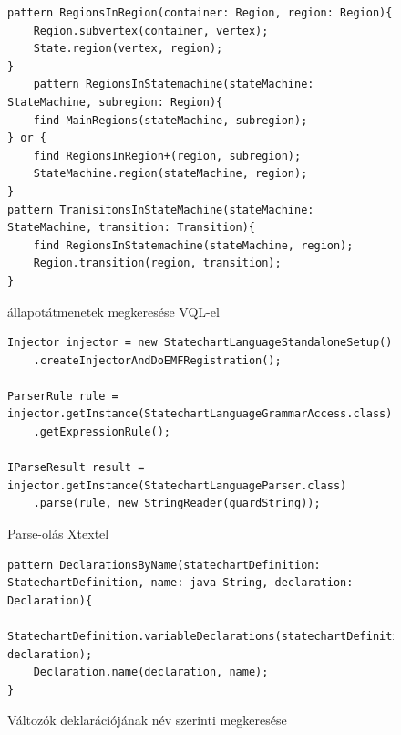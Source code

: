 \begin{figure}[!ht]
	\lstset{style=VQL}
	\begin{lstlisting}
pattern RegionsInRegion(container: Region, region: Region){
	Region.subvertex(container, vertex);
	State.region(vertex, region);
}
	pattern RegionsInStatemachine(stateMachine: StateMachine, subregion: Region){
	find MainRegions(stateMachine, subregion);
} or {
	find RegionsInRegion+(region, subregion);
	StateMachine.region(stateMachine, region);
}
pattern TranisitonsInStateMachine(stateMachine: StateMachine, transition: Transition){
	find RegionsInStatemachine(stateMachine, region);
	Region.transition(region, transition);
}
	\end{lstlisting}
	\caption{állapotátmenetek megkeresése VQL-el}
\end{figure}
\begin{figure}[!ht]
\lstset{style=javacode}
\begin{lstlisting}
Injector injector = new StatechartLanguageStandaloneSetup()
	.createInjectorAndDoEMFRegistration();

ParserRule rule = injector.getInstance(StatechartLanguageGrammarAccess.class)
	.getExpressionRule();

IParseResult result = injector.getInstance(StatechartLanguageParser.class)
	.parse(rule, new StringReader(guardString));
\end{lstlisting}
\caption{Parse-olás Xtextel}
\end{figure}

\begin{figure}[!ht]
\lstset{style=VQL}
\begin{lstlisting}
pattern DeclarationsByName(statechartDefinition: StatechartDefinition, name: java String, declaration: Declaration){
	StatechartDefinition.variableDeclarations(statechartDefinition, declaration);
	Declaration.name(declaration, name);
}
\end{lstlisting}
\caption{Változók deklarációjának név szerinti megkeresése}
\end{figure}




